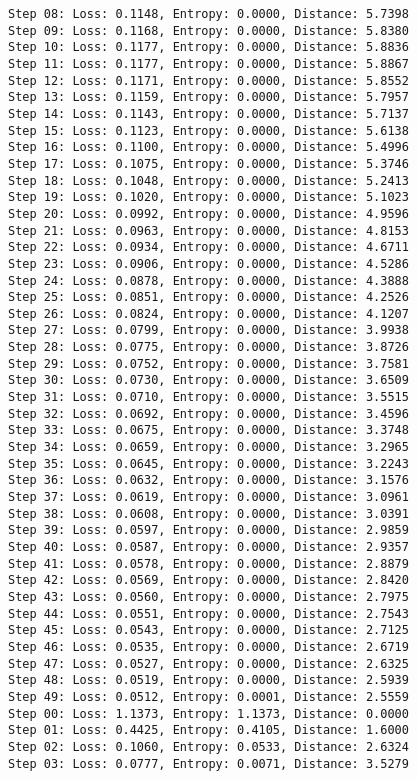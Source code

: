 \documentclass[11pt]{article}
\begin{document}
\begin{Verbatim}[commandchars=\\\{\}]
Step 08: Loss: 0.1148, Entropy: 0.0000, Distance: 5.7398
Step 09: Loss: 0.1168, Entropy: 0.0000, Distance: 5.8380
Step 10: Loss: 0.1177, Entropy: 0.0000, Distance: 5.8836
Step 11: Loss: 0.1177, Entropy: 0.0000, Distance: 5.8867
Step 12: Loss: 0.1171, Entropy: 0.0000, Distance: 5.8552
Step 13: Loss: 0.1159, Entropy: 0.0000, Distance: 5.7957
Step 14: Loss: 0.1143, Entropy: 0.0000, Distance: 5.7137
Step 15: Loss: 0.1123, Entropy: 0.0000, Distance: 5.6138
Step 16: Loss: 0.1100, Entropy: 0.0000, Distance: 5.4996
Step 17: Loss: 0.1075, Entropy: 0.0000, Distance: 5.3746
Step 18: Loss: 0.1048, Entropy: 0.0000, Distance: 5.2413
Step 19: Loss: 0.1020, Entropy: 0.0000, Distance: 5.1023
Step 20: Loss: 0.0992, Entropy: 0.0000, Distance: 4.9596
Step 21: Loss: 0.0963, Entropy: 0.0000, Distance: 4.8153
Step 22: Loss: 0.0934, Entropy: 0.0000, Distance: 4.6711
Step 23: Loss: 0.0906, Entropy: 0.0000, Distance: 4.5286
Step 24: Loss: 0.0878, Entropy: 0.0000, Distance: 4.3888
Step 25: Loss: 0.0851, Entropy: 0.0000, Distance: 4.2526
Step 26: Loss: 0.0824, Entropy: 0.0000, Distance: 4.1207
Step 27: Loss: 0.0799, Entropy: 0.0000, Distance: 3.9938
Step 28: Loss: 0.0775, Entropy: 0.0000, Distance: 3.8726
Step 29: Loss: 0.0752, Entropy: 0.0000, Distance: 3.7581
Step 30: Loss: 0.0730, Entropy: 0.0000, Distance: 3.6509
Step 31: Loss: 0.0710, Entropy: 0.0000, Distance: 3.5515
Step 32: Loss: 0.0692, Entropy: 0.0000, Distance: 3.4596
Step 33: Loss: 0.0675, Entropy: 0.0000, Distance: 3.3748
Step 34: Loss: 0.0659, Entropy: 0.0000, Distance: 3.2965
Step 35: Loss: 0.0645, Entropy: 0.0000, Distance: 3.2243
Step 36: Loss: 0.0632, Entropy: 0.0000, Distance: 3.1576
Step 37: Loss: 0.0619, Entropy: 0.0000, Distance: 3.0961
Step 38: Loss: 0.0608, Entropy: 0.0000, Distance: 3.0391
Step 39: Loss: 0.0597, Entropy: 0.0000, Distance: 2.9859
Step 40: Loss: 0.0587, Entropy: 0.0000, Distance: 2.9357
Step 41: Loss: 0.0578, Entropy: 0.0000, Distance: 2.8879
Step 42: Loss: 0.0569, Entropy: 0.0000, Distance: 2.8420
Step 43: Loss: 0.0560, Entropy: 0.0000, Distance: 2.7975
Step 44: Loss: 0.0551, Entropy: 0.0000, Distance: 2.7543
Step 45: Loss: 0.0543, Entropy: 0.0000, Distance: 2.7125
Step 46: Loss: 0.0535, Entropy: 0.0000, Distance: 2.6719
Step 47: Loss: 0.0527, Entropy: 0.0000, Distance: 2.6325
Step 48: Loss: 0.0519, Entropy: 0.0000, Distance: 2.5939
Step 49: Loss: 0.0512, Entropy: 0.0001, Distance: 2.5559
Step 00: Loss: 1.1373, Entropy: 1.1373, Distance: 0.0000
Step 01: Loss: 0.4425, Entropy: 0.4105, Distance: 1.6000
Step 02: Loss: 0.1060, Entropy: 0.0533, Distance: 2.6324
Step 03: Loss: 0.0777, Entropy: 0.0071, Distance: 3.5279

\end{Verbatim}
\end{document}

